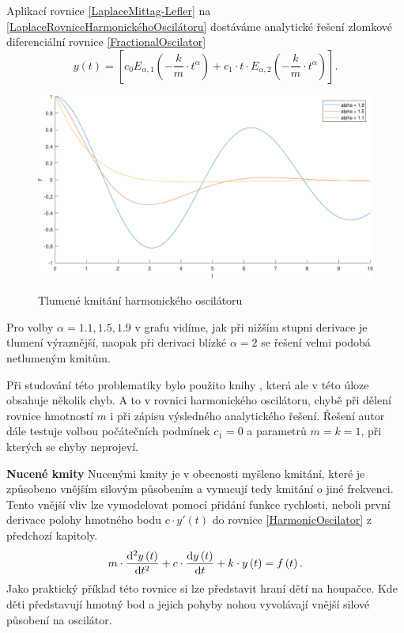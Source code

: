 \documentclass[a4paper,12pt,twoside]{article}
\theoremstyle{definition}
\theoremstyle{remark}
\numberwithin{equation}{section}
\numberwithin{table}{section}
\numberwithin{figure}{section}
\newcommand{\dx}[1]{\mathrm{d} #1}
\begin{document}
Aplikací  rovnice \eqref{LaplaceMittag-Lefler} na \eqref{LaplaceRovniceHarmonickéhoOscilátoru} dostáváme analytické řešení zlomkové diferenciální rovnice \eqref{FractionalOscilator}
\begin{equation}\label{LaplaceMittagLefler}
	y\left(t\right) = \left[ c_{0} E_{\alpha, 1}\left(-\frac{k}{m}\cdot t^{\alpha}\right) + c_{1}\cdot t \cdot E_{\alpha, 2} \left(-\frac{k}{m}\cdot t ^{\alpha}\right)\right] .
\end{equation}
\begin{figure} [h!]
	\caption{Tlumené kmitání harmonického oscilátoru}
	\includegraphics[width=1\textwidth]{FractionalOscillator_AnalyticalSolution.pdf}
	\label{fig:HarmonicOscilatorAnalytical}
\end{figure}

Pro volby $\alpha = 1.1, 1.5, 1.9$ v grafu vidíme, jak při nižším stupni derivace je tlumení výraznější, naopak při derivaci blízké $\alpha = 2$ se řešení velmi podobá netlumeným kmitům.

Při studování této problematiky bylo použito knihy \cite{ChenInMechanics}, která ale v této úloze obsahuje několik chyb. A to v rovnici harmonického oscilátoru, chybě při dělení rovnice hmotností $m$ i při zápisu výsledného analytického řešení. Řešení autor dále testuje volbou počátečních podmínek $c_{1} = 0$ a parametrů $m = k = 1$, při kterých se chyby neprojeví. %




\textbf{Nucené kmity}
Nucenými kmity je v obecnosti myšleno kmitání, které je způsobeno vnějším silovým působením a vynucují tedy kmitání o jiné frekvenci.
Tento vnější vliv lze vymodelovat pomocí přidání funkce rychlosti, neboli první derivace polohy hmotného bodu $c\cdot y'\left(t\right)$ do rovnice \ref{HarmonicOscilator} z předchozí kapitoly.
\begin{equation}
	m\cdot \frac{\dx ^{2} y\left(t\right)}{\dx t^{2}} + c\cdot \frac{\dx  y\left(t\right)}{\dx t} +k \cdot y\left(t\right) = f\left(t\right).
\end{equation}
Jako praktický příklad této rovnice si lze představit hraní dětí na houpačce. Kde děti představují hmotný bod a jejich pohyby nohou vyvolávají vnější silové působení na oscilátor.
\end{document}
